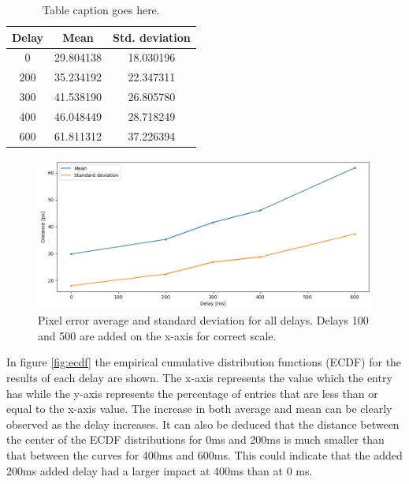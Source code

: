 \documentclass[nofilelist]{cslthse-msc}
\begin{document}
\begin{table}[ht]
   \centering
   \begin{tabular}{|c|c|c|}
   \hline
   \textbf{Delay} & \textbf{ Mean} & \textbf{Std. deviation} \\
   \hline
   0 & 29.804138 & 18.030196 \\ \hline
   200 & 35.234192 & 22.347311 \\ \hline
   300 & 41.538190 & 26.805780 \\ \hline
   400 & 46.048449 & 28.718249 \\ \hline
   600 & 61.811312 & 37.226394 \\ \hline
   \end{tabular}
   \caption{Table caption goes here.}
   \label{tab:averages}
\end{table}


\begin{figure}[!hbt]
   \centering
   \includegraphics[scale=0.5]{images/avg-std.png} 
   \caption{Pixel error average and standard deviation for all delays. Delays 100 and 500 are added on the x-axis for correct scale.}
   \label{fig:avg-std}
\end{figure}

In figure \ref{fig:ecdf} the empirical cumulative distribution functions (ECDF) for the results of each delay are shown. The x-axis represents the value which the entry has while the y-axis represents the percentage of entries that are less than or equal to the x-axis value. The increase in both average and mean can be clearly observed as the delay increases. It can also be deduced that the distance between the center of the ECDF distributions for 0ms and 200ms is much smaller than that between the curves for 400ms and 600ms. This could indicate that the added 200ms added delay had a larger impact at 400ms than at 0 ms.
\end{document}
